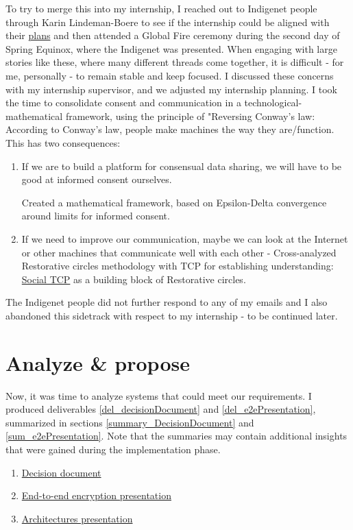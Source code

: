 \documentclass[journal, dvipsnames]{IEEEtran}
\begin{document}
To try to merge this into my internship, I reached out to Indigenet people through Karin Lindeman-Boere to see if the internship could be aligned with their \href{https://docs.google.com/document/d/1tcp0hSSnMnSV99H6g8kqmGOQCOGjsodN_2reJQIWnuY/edit?usp=sharing}{plans} and then attended a Global Fire ceremony during the second day of Spring Equinox, where the Indigenet was presented. 
When engaging with large stories like these, where many different threads come together, it is difficult - for me, personally - to remain stable and keep focused. I discussed these concerns with my internship supervisor, and we adjusted my internship planning.
I took the time to consolidate consent and communication in a technological-mathematical framework, using the principle of "Reversing Conway's law: According to Conway's law, people make machines the way they are/function. This has two consequences:
\begin{enumerate}
  \item If we are to build a platform for consensual data sharing, we will have to be good at informed consent ourselves.
  
  Created a mathematical framework, based on Epsilon-Delta convergence around limits for informed consent.

  \item If we need to improve our communication, maybe we can look at the Internet or other machines that communicate well with each other - Cross-analyzed Restorative circles methodology with TCP for establishing understanding: \href{https://gitlab.opengeohub.org/fee.gevaert/principle-layouts/-/blob/phpbb/principles/16GuidingPrinciples/Communication.md#one-way-social-tcp}{Social TCP} as a building block of Restorative circles.  
\end{enumerate}

The Indigenet people did not further respond to any of my emails and I also abandoned this sidetrack with respect to my internship - to be continued later.


\section{Analyze \& propose}
Now, it was time to analyze systems that could meet our requirements. I produced deliverables \ref{del_decisionDocument} and \ref{del_e2ePresentation}, summarized in sections \ref{summary_DecisionDocument} and \ref{sum_e2ePresentation}. Note that the summaries may contain additional insights that were gained during the implementation phase.
\begin{enumerate}
  \item \href{https://docs.google.com/document/d/1bxCd3oxserzdNz98-12DHdOx_bQ2_ttHqPBMA0MPbIQ/edit?usp=sharing}{Decision document} \label{del_decisionDocument}
  \item \href{https://docs.google.com/presentation/d/1QwwVlNHP4PusyaKUcVZm6yY4fE4Gvc-jvtrzb56AaiQ/edit?usp=sharing}{End-to-end encryption presentation} \label{del_e2ePresentation}
  \item \href{https://docs.google.com/presentation/d/1NcNuoZ3ZPwRCdgzK4sDLOQTIY9Mr8e3Xz_oWJ1sTwCs/edit?usp=sharing}{Architectures presentation} \label{del_architectures}
\end{enumerate}
\end{document}
